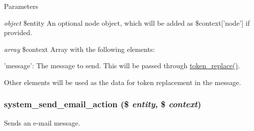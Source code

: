 \begin{DoxyParams}{Parameters}
\item[{\em object}]\$entity An optional node object, which will be added as \$context\mbox{[}'node'\mbox{]} if provided. \item[{\em array}]\$context Array with the following elements:
\begin{DoxyItemize}
\item 'message': The message to send. This will be passed through \hyperlink{includes_2token_8inc_a47eb294b05ca8d04439a9a82ccc4d82a}{token\_\-replace()}.
\item Other elements will be used as the data for token replacement in the message. 
\end{DoxyItemize}\end{DoxyParams}
\hypertarget{group__actions_gae09a4cd8054571b9ac3659adccfac574}{
\subsubsection[{system\_\-send\_\-email\_\-action}]{\setlength{\rightskip}{0pt plus 5cm}system\_\-send\_\-email\_\-action (\$ {\em entity}, \/  \$ {\em context})}}
\label{group__actions_gae09a4cd8054571b9ac3659adccfac574}
Sends an e-\/mail message.


